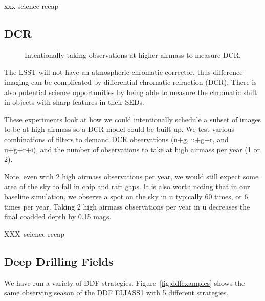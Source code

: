 xxx-science recap


\subsection{DCR}

\begin{figure}
\caption{Intentionally taking observations at higher airmass to measure DCR.}
\end{figure}


The LSST will not have an atmospheric chromatic corrector, thus difference imaging can be complicated by differential chromatic refraction (DCR). There is also potential science opportunities by being able to measure the chromatic shift in objects with sharp features in their SEDs.

These experiments look at how we could intentionally schedule a subset of images to be at high airmass so a DCR model could be built up. We test various combinations of filters to demand DCR observations (u+g, u+g+r, and u+g+r+i), and the number of observations to take at high airmass per year (1 or 2). 

Note, even with 2 high airmass observations per year, we would still expect some area of the sky to fall in chip and raft gaps.  It is also worth noting that in our baseline simulation, we observe a spot on the sky in u typically 60 times, or 6 times per year. Taking 2 high airmass observations per year in u decreases the final coadded depth by 0.15 mags.


XXX--science recap

   
\subsection{Deep Drilling Fields}

We have run a variety of DDF strategies. Figure~\ref{fig:ddfexamples} shows the same observing season of the DDF ELIASS1 with 5 different strategies. 

